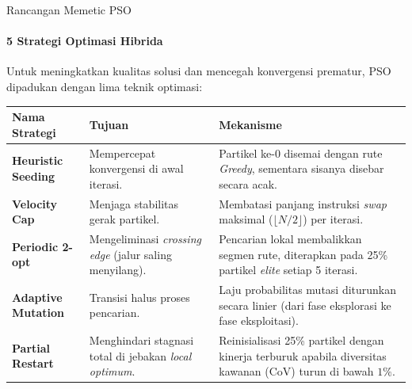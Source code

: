 \documentclass[aspectratio=169,10pt]{beamer}
\begin{document}
\begin{frame}{Rancangan Memetic PSO}
  \framesubtitle{5 Strategi Optimasi Hibrida}
  Untuk meningkatkan kualitas solusi dan mencegah konvergensi prematur, PSO dipadukan dengan lima teknik optimasi:
  \vspace{0.2cm}
  \begin{table}[]
    \centering
    \scriptsize
    \begin{tabular}{@{}p{2.5cm}p{4cm}p{6.5cm}@{}}
      \toprule
      \textbf{Nama Strategi} & \textbf{Tujuan} & \textbf{Mekanisme} \\
      \midrule
      \textbf{Heuristic Seeding} & Mempercepat konvergensi di awal iterasi. & Partikel ke-0 disemai dengan rute \textit{Greedy}, sementara sisanya disebar secara acak.\\
      \addlinespace
      \textbf{Velocity Cap} & Menjaga stabilitas gerak partikel. & Membatasi panjang instruksi \textit{swap} maksimal ($\lfloor N/2 \rfloor$) per iterasi.\\
      \addlinespace
      \textbf{Periodic 2-opt} & Mengeliminasi \textit{crossing edge} (jalur saling menyilang). & Pencarian lokal membalikkan segmen rute, diterapkan pada 25\% partikel \textit{elite} setiap 5 iterasi.\\
      \addlinespace
      \textbf{Adaptive Mutation} & Transisi halus proses pencarian. & Laju probabilitas mutasi diturunkan secara linier (dari fase eksplorasi ke fase eksploitasi).\\
      \addlinespace
      \textbf{Partial Restart} & Menghindari stagnasi total di jebakan \textit{local optimum}. & Reinisialisasi 25\% partikel dengan kinerja terburuk apabila diversitas kawanan (CoV) turun di bawah $1\%$.\\
      \bottomrule
    \end{tabular}
  \end{table}
\end{frame}
\end{document}
